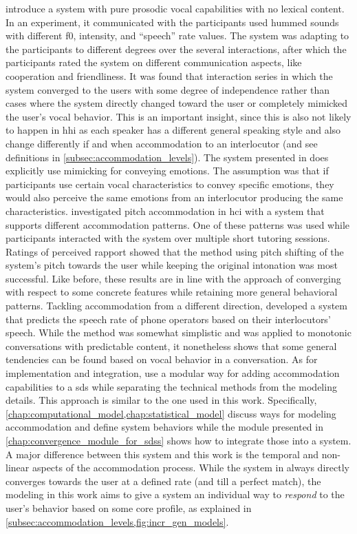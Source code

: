 \citet{Suzuki2003effects} introduce a system with pure prosodic vocal capabilities with no lexical content.
In an experiment, it communicated with the participants used hummed sounds with different \ac{f0}, intensity, and \enquote{speech} rate values.
The system was adapting to the participants to different degrees over the several interactions, after which the participants rated the system on different communication aspects, like cooperation and friendliness.
It was found that interaction series in which the system converged to the users with some degree of independence rather than cases where the system directly changed toward the user or completely mimicked the user's vocal behavior.
This is an important insight, since this is also not likely to happen in \ac{hhi} as each speaker has a different general speaking style and also change differently if and when accommodation to an interlocutor (and see definitions in \cref{subsec:accommodation_levels}).
The system presented in \citet{Acosta2011achieving} does explicitly use mimicking for conveying emotions.
The assumption was that if participants use certain vocal characteristics to convey specific emotions, they would also perceive the same emotions from an interlocutor producing the same characteristics.
\citet{Lubold2015naturalness} investigated pitch accommodation in \ac{hci} with a system that supports different accommodation patterns.
One of these patterns was used while participants interacted with the system over multiple short tutoring sessions.
Ratings of perceived rapport showed that the method using pitch shifting of the system's pitch towards the user while keeping the original intonation was most successful.
Like before, these results are in line with the approach of converging with respect to some concrete features while retaining more general behavioral patterns.
Tackling accommodation from a different direction, \citet{Ward2004automatic} developed a system that predicts the speech rate of phone operators based on their interlocutors' speech.
While the method was somewhat simplistic and was applied to monotonic conversations with predictable content, it nonetheless shows that some general tendencies can be found based on vocal behavior in a conversation.
As for implementation and integration, \citet{Levitan2016implementing} use a modular way for adding accommodation capabilities to a \ac{sds} while separating the technical methods from the modeling details.
This approach is similar to the one used in this work.
Specifically, \cref{chap:computational_model,chap:statistical_model} discuss ways for modeling accommodation and define system behaviors while the module presented in \cref{chap:convergence_module_for_sdss} shows how to integrate those into a system.
A major difference between this system and this work is the temporal and non-linear aspects of the accommodation process.
While the system in \citet{Levitan2016implementing} always directly converges towards the user at a defined rate (and till a perfect match), the modeling in this work aims to give a system an individual way to \emph{respond} to the user's behavior based on some core profile, as explained in \cref{subsec:accommodation_levels,fig:incr_gen_models}.


